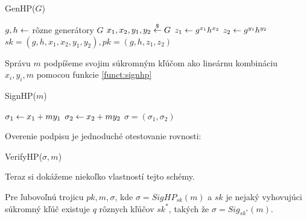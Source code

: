 \begin{function}[h!]
    \caption{GenHP($G$)}
    \label{funct:genhp}
    $g,h \leftarrow $ rôzne generátory $G$\;
    $x_1,x_2,y_1,y_2 \overset{\$}{\leftarrow} G$\;
    $z_1 \leftarrow g^{x_1} h^{x_2}$\;
    $z_2 \leftarrow g^{y_1} h^{y_2}$\;
    \Return $sk=(g,h,x_1,x_2,y_1,y_2), pk=(g,h,z_1,z_2)$\;
\end{function}

Správu $m$ podpíšeme svojim súkromným kľúčom ako lineárnu kombináciu
$x_i, y_i, m$ pomocou funkcie \ref{funct:signhp}
\begin{function}[h!]
    \caption{SignHP($m$)}
    \label{funct:signhp}
    $\sigma_1 \leftarrow x_1 + m y_1$\;
    $\sigma_2 \leftarrow x_2 + m y_2$\;
    \Return $\sigma=(\sigma_1,\sigma_2)$\;
\end{function}

Overenie podpisu je jednoduché otestovanie
rovnosti:
\begin{function}[h!]
    \caption{VerifyHP($\sigma,m$)}
\end{function}

Teraz si dokážeme niekoľko vlastností tejto schémy.

\begin{lema}
Pre ľubovoľnú trojicu $pk, m, \sigma$, kde $\sigma = SigHP_{sk}(m)$
a $sk$ je nejaký vyhovujúci súkromný kľúč
existuje $q$ rôznych kľúčov $sk^*$, takých že $\sigma = Sig_{sk^*}(m)$.
\end{lema}

